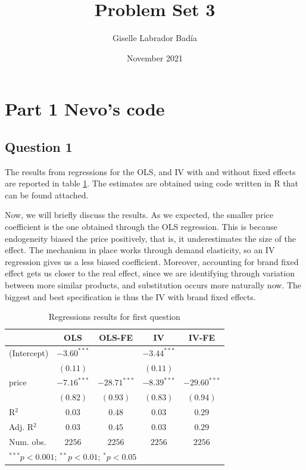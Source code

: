 \documentclass{article}
\title{Problem Set 3}
\author{Giselle Labrador Badía}
\date{November 2021}
\theoremstyle{definition}
\begin{document}
\maketitle

\section*{Part 1 Nevo's code}

\subsection*{Question 1}

The results from regressions for the OLS, and IV with and without fixed effects are reported in table \ref{tab:1}. The estimates are obtained using code written in R that can be found attached. 

Now, we will briefly discuss the results. As we expected, the smaller price coefficient is the one obtained through the OLS regression. This is because endogeneity biased the price positively, that is, it underestimates the size of the effect. The mechanism in place works through demand elasticity, so an IV regression gives us a less biased coefficient. Moreover, accounting for brand fixed effect gets us closer to the real effect, since we are identifying through variation between more similar products, and substitution occurs more naturally now. The biggest and best specification is thus the IV with brand fixed effects.



\begin{table}[h]
\begin{center}
\begin{tabular}{l c c c c}
\hline
 & OLS & OLS-FE & IV & IV-FE \\
\hline
(Intercept)     & $-3.60^{***}$ &                & $-3.44^{***}$ &                \\
                & $(0.11)$      &                & $(0.11)$      &                \\
price           & $-7.16^{***}$ & $-28.71^{***}$ & $-8.39^{***}$ & $-29.60^{***}$ \\
                & $(0.82)$      & $(0.93)$       & $(0.83)$      & $(0.94)$       \\

\hline
R$^2$           & $0.03$        & $0.48$         & $0.03$        & $0.29$         \\
Adj. R$^2$      & $0.03$        & $0.45$         & $0.03$        & $0.29$         \\
Num. obs.       & $2256$        & $2256$         & $2256$        & $2256$         \\
\hline
\multicolumn{5}{l}{\scriptsize{$^{***}p<0.001$; $^{**}p<0.01$; $^{*}p<0.05$}}
\end{tabular}
\caption{Regressions results for first question}
\label{tab:1}
\end{center}
\end{table}
\end{document}

